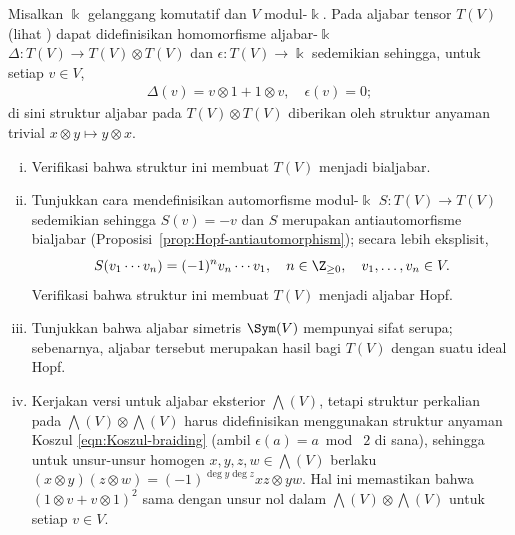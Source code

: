 	\item Misalkan $\Bbbk$ gelanggang komutatif dan $V$ modul-$\Bbbk$. Pada
	aljabar tensor $T(V)$ (lihat \cite[Definisi 7.5.1]{Li1}) dapat didefinisikan
	homomorfisme aljabar-$\Bbbk$
	$\Delta:T(V)\to T(V)\otimes T(V)$ dan $\epsilon:T(V)\to\Bbbk$ sedemikian
	sehingga, untuk setiap $v\in V$,
	\begin{gather*}
		\Delta(v) = v \otimes 1 + 1 \otimes v, \quad \epsilon(v) = 0;
	\end{gather*}
	di sini struktur aljabar pada $T(V)\otimes T(V)$ diberikan oleh struktur
	anyaman trivial $x\otimes y\mapsto y\otimes x$.
	\begin{enumerate}[(i)]
		\item Verifikasi bahwa struktur ini membuat $T(V)$ menjadi bialjabar.
		\item Tunjukkan cara mendefinisikan automorfisme modul-$\Bbbk$
		$S:T(V)\to T(V)$ sedemikian sehingga $S(v)=-v$ dan $S$ merupakan
		antiautomorfisme bialjabar (Proposisi~\ref{prop:Hopf-antiautomorphism});
		secara lebih eksplisit,
		\[ S(v_1 \cdots v_n) = (-1)^n v_n \cdots v_1, \quad n \in \Z_{\geq 0}, \quad v_1, \ldots, v_n \in V. \]
		Verifikasi bahwa struktur ini membuat $T(V)$ menjadi aljabar Hopf.
		\item Tunjukkan bahwa aljabar simetris $\Sym(V)$ mempunyai sifat serupa;
		sebenarnya, aljabar tersebut merupakan hasil bagi $T(V)$ dengan suatu
		ideal Hopf.
		\item Kerjakan versi untuk aljabar eksterior $\bigwedge(V)$, tetapi
		struktur perkalian pada $\bigwedge(V)\otimes\bigwedge(V)$ harus
		didefinisikan menggunakan struktur anyaman Koszul
		\eqref{eqn:Koszul-braiding} (ambil $\epsilon(a)=a\bmod\;2$ di sana),
		sehingga untuk unsur-unsur homogen
		$x,y,z,w\in\bigwedge(V)$ berlaku
		$(x\otimes y)(z\otimes w)=(-1)^{\deg y\deg z}xz\otimes yw$. Hal ini
		memastikan bahwa $(1\otimes v+v\otimes1)^2$ sama dengan unsur nol dalam
		$\bigwedge(V)\otimes\bigwedge(V)$ untuk setiap $v\in V$.
	\end{enumerate}


